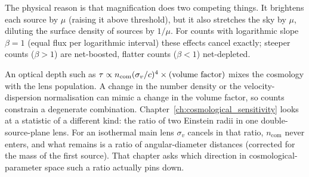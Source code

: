 The physical reason is that magnification does two competing things.  It
brightens each source by $\mu$ (raising it above threshold), but it also
stretches the sky by $\mu$, diluting the surface density of sources by
$1/\mu$.  For counts with logarithmic slope $\beta = 1$ (equal flux per
logarithmic interval) these effects cancel exactly; steeper counts
($\beta>1$) are net-boosted, flatter counts ($\beta<1$) net-depleted.

\begin{bridge}
An optical depth such as $\tau \propto n_{\mathrm{com}}(\sigma_v/c)^4
\times(\text{volume factor})$ mixes the cosmology with the lens population.
A change in the number density or the velocity-dispersion normalisation can
mimic a change in the volume factor, so counts constrain a degenerate
combination.  Chapter~\ref{ch:cosmological_sensitivity} looks at a statistic
of a different kind: the ratio of two Einstein radii in one double-source-plane
lens.  For an isothermal main lens $\sigma_v$ cancels in that ratio,
$n_{\mathrm{com}}$ never enters, and what remains is a ratio of
angular-diameter distances (corrected for the mass of the first source).  That chapter asks which direction in
cosmological-parameter space such a ratio actually pins down.
\end{bridge}
